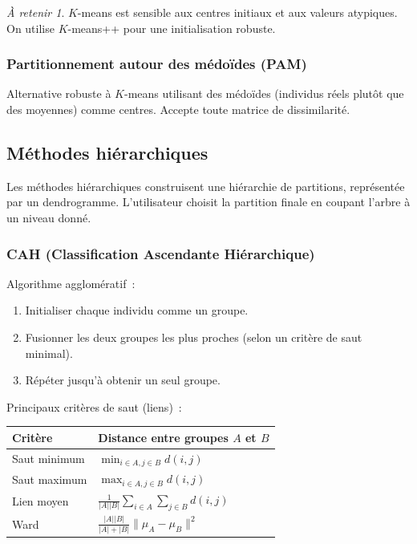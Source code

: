 \documentclass[a4paper,11pt]{article}
\theoremstyle{definition}
\theoremstyle{remark}
\newtheorem*{important}{\`A retenir}
\begin{document}
\begin{important}
  $K$-means est sensible aux centres initiaux et aux valeurs
  atypiques. On utilise $K$-means++ pour une initialisation robuste.
\end{important}

\subsubsection{Partitionnement autour des m\'edo\"ides (PAM)}

Alternative robuste \`a $K$-means utilisant des m\'edo\"ides
(individus r\'eels plut\^ot que des moyennes) comme centres.
Accepte toute matrice de dissimilarit\'e.

\subsection{M\'ethodes hi\'erarchiques}

Les m\'ethodes hi\'erarchiques construisent une hi\'erarchie de
partitions, repr\'esent\'ee par un dendrogramme. L'utilisateur
choisit la partition finale en coupant l'arbre \`a un niveau
donn\'e.

\subsubsection{CAH (Classification Ascendante Hi\'erarchique)}

Algorithme agglom\'eratif~:
\begin{enumerate}
  \item Initialiser chaque individu comme un groupe.
  \item Fusionner les deux groupes les plus proches (selon un crit\`ere
    de saut minimal).
  \item R\'ep\'eter jusqu'\`a obtenir un seul groupe.
\end{enumerate}

Principaux crit\`eres de saut (liens)~:

\begin{tabular}{ll}
\toprule
Crit\`ere & Distance entre groupes $A$ et $B$ \\
\midrule
Saut minimum & $\displaystyle \min_{i \in A, j \in B} d(i,j)$ \\
Saut maximum & $\displaystyle \max_{i \in A, j \in B} d(i,j)$ \\
Lien moyen & $\displaystyle \frac{1}{|A||B|} \sum_{i \in A} \sum_{j \in B} d(i,j)$ \\
Ward & $\displaystyle \frac{|A||B|}{|A|+|B|} \| \mu_A - \mu_B \|^2$ \\
\bottomrule
\end{tabular}
\end{document}
